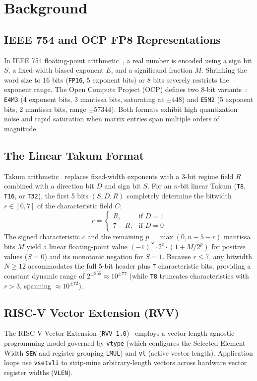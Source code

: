 \documentclass[conference]{IEEEtran}
\begin{document}
\section{Background}
\label{sec:background}

\subsection{IEEE 754 and OCP FP8 Representations}
In IEEE 754 floating-point arithmetic~\cite{ieee754}, a real number is encoded using a sign bit $S$, a fixed-width biased exponent $E$, and a significand fraction $M$. Shrinking the word size to 16 bits (\texttt{FP16}, 5 exponent bits) or 8 bits severely restricts the exponent range. The Open Compute Project (OCP) defines two 8-bit variants~\cite{ocp_fp8}: \texttt{E4M3} (4 exponent bits, 3 mantissa bits, saturating at $\pm 448$) and \texttt{E5M2} (5 exponent bits, 2 mantissa bits, range $\pm 57344$). Both formats exhibit high quantization noise and rapid saturation when matrix entries span multiple orders of magnitude.

\subsection{The Linear Takum Format}
Takum arithmetic~\cite{hunhold2024takum} replaces fixed-width exponents with a 3-bit regime field $R$ combined with a direction bit $D$ and sign bit $S$. For an $n$-bit linear Takum (\texttt{T8}, \texttt{T16}, or \texttt{T32}), the first 5 bits $(S, D, R)$ completely determine the bitwidth $r \in [0, 7]$ of the characteristic field $C$:
\begin{equation}
    r = \begin{cases} R, & \text{if } D = 1 \\ 7 - R, & \text{if } D = 0 \end{cases}
\end{equation}
The signed characteristic $c$ and the remaining $p = \max(0, n - 5 - r)$ mantissa bits $M$ yield a linear floating-point value $(-1)^S \cdot 2^c \cdot (1 + M / 2^p)$ for positive values ($S=0$) and its monotonic negation for $S=1$. Because $r \le 7$, any bitwidth $N \ge 12$ accommodates the full 5-bit header plus 7 characteristic bits, providing a constant dynamic range of $2^{\pm 255} \approx 10^{\pm 77}$ (while \texttt{T8} truncates characteristics with $r > 3$, spanning $\approx 10^{\pm 72}$).

\subsection{RISC-V Vector Extension (RVV)}
The RISC-V Vector Extension (\texttt{RVV 1.0})~\cite{riscv_v_spec} employs a vector-length agnostic programming model governed by \texttt{vtype} (which configures the Selected Element Width \texttt{SEW} and register grouping \texttt{LMUL}) and \texttt{vl} (active vector length). Application loops use \texttt{vsetvli} to strip-mine arbitrary-length vectors across hardware vector register widths (\texttt{VLEN}).
\end{document}
